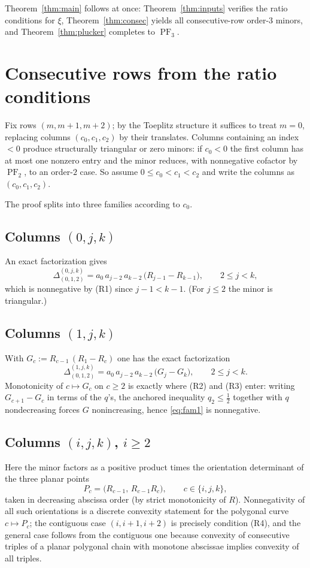 \documentclass[11pt]{amsart}
\theoremstyle{definition}
\theoremstyle{remark}
\DeclareMathOperator{\PF}{PF}
\newcommand{\minor}[2]{\Delta_{#1}^{#2}}
\begin{document}
Theorem~\ref{thm:main} follows at once:
Theorem~\ref{thm:inputs} verifies the ratio conditions for $\xi$,
Theorem~\ref{thm:consec} yields all consecutive-row order-$3$ minors,
and Theorem~\ref{thm:plucker} completes to $\PF_3$.

\section{Consecutive rows from the ratio conditions}\label{sec:consec}

Fix rows $(m,m+1,m+2)$; by the Toeplitz structure it suffices to treat
$m=0$, replacing columns $(c_0,c_1,c_2)$ by their translates. Columns
containing an index $<0$ produce structurally triangular or zero
minors: if $c_0<0$ the first column has at most one nonzero entry and
the minor reduces, with nonnegative cofactor by $\PF_2$, to an
order-$2$ case. So assume $0\le c_0<c_1<c_2$ and write the columns as
$(c_0,c_1,c_2)$.

The proof splits into three families according to $c_0$.

\subsection{Columns \texorpdfstring{$(0,j,k)$}{(0,j,k)}}
An exact factorization gives
\begin{equation}\label{eq:fam0}
\minor{(0,1,2)}{(0,j,k)}
= a_0\,a_{j-2}\,a_{k-2}\,\bigl(R_{j-1}-R_{k-1}\bigr),
\qquad 2\le j<k,
\end{equation}
which is nonnegative by (R1) since $j-1<k-1$. (For $j\le 2$ the minor
is triangular.)

\subsection{Columns \texorpdfstring{$(1,j,k)$}{(1,j,k)}}
With $G_c:=R_{c-1}\,(R_1-R_c)$ one has the exact factorization
\begin{equation}\label{eq:fam1}
\minor{(0,1,2)}{(1,j,k)}
= a_0\,a_{j-2}\,a_{k-2}\,\bigl(G_j-G_k\bigr),
\qquad 2\le j<k .
\end{equation}
Monotonicity of $c\mapsto G_c$ on $c\ge 2$ is exactly where (R2) and
(R3) enter: writing $G_{c+1}-G_c$ in terms of the $q$'s, the
anchored inequality $q_2\le\tfrac12$ together with $q$ nondecreasing
forces $G$ nonincreasing, hence \eqref{eq:fam1} is nonnegative.

\subsection{Columns \texorpdfstring{$(i,j,k)$, $i\ge 2$}{(i,j,k), i >= 2}}
Here the minor factors as a positive product times the orientation
determinant of the three planar points
\[
P_c=\bigl(R_{c-1},\,R_{c-1}R_c\bigr),\qquad c\in\{i,j,k\},
\]
taken in decreasing abscissa order (by strict monotonicity of
$R$). Nonnegativity of all such orientations is a discrete convexity
statement for the polygonal curve $c\mapsto P_c$; the contiguous case
$(i,i+1,i+2)$ is precisely condition (R4), and the general case follows
from the contiguous one because convexity of consecutive triples of a
planar polygonal chain with monotone abscissae implies convexity of all
triples.
\end{document}

